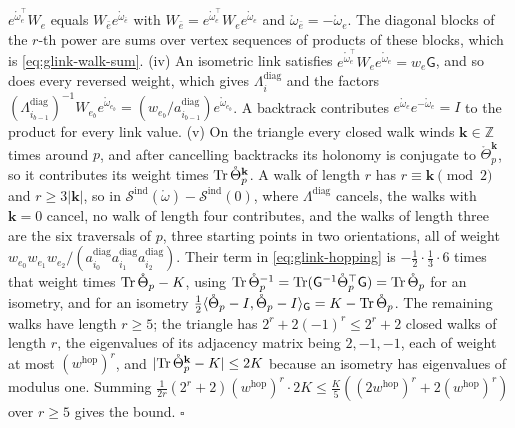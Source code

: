 \(e^{\mathring\omega_e^\top}W_e\) equals \(W_{\bar e}e^{\mathring\omega_{\bar e}}\) with
\(W_{\bar e}=e^{\mathring\omega_e^\top}W_ee^{\mathring\omega_e}\) and \(\mathring\omega_{\bar e}=-\mathring\omega_e\). The
diagonal blocks of the \(r\)-th power are sums over vertex sequences of products of these blocks, which
is \eqref{eq:glink-walk-sum}.
(iv) An isometric link satisfies \(e^{\mathring\omega_e^\top}W_ee^{\mathring\omega_e}=w_e\mathsf G\), and so does
every reversed weight, which gives \(\Lambda^{\mathrm{diag}}_i\) and the factors
\((\Lambda^{\mathrm{diag}}_{i_{b-1}})^{-1}W_{e_b}e^{\mathring\omega_{e_b}}=(w_{e_b}/a^{\mathrm{diag}}_{i_{b-1}})e^{\mathring\omega_{e_b}}\).
A backtrack contributes \(e^{\mathring\omega_e}e^{-\mathring\omega_e}=I\) to the product for every link value.
(v) On the triangle every closed walk winds \(\mathbf k\in\mathbb Z\) times around \(p\), and after
cancelling backtracks its holonomy is conjugate to \(\mathring\Theta_p^{\mathbf k}\), so it contributes its
weight times \(\operatorname{Tr}\mathring\Theta_p^{\mathbf k}\). A walk of length \(r\) has \(r\equiv\mathbf k\pmod2\) and
\(r\geq3\lvert\mathbf k\rvert\), so in \(\mathscr S^{\mathrm{ind}}(\mathring\omega)-\mathscr S^{\mathrm{ind}}(0)\),
where \(\Lambda^{\mathrm{diag}}\) cancels, the walks with \(\mathbf k=0\) cancel, no walk of length four
contributes, and the walks of length three are the six traversals of \(p\), three starting points in two
orientations, all of weight \(w_{e_0}w_{e_1}w_{e_2}/(a^{\mathrm{diag}}_{i_0}a^{\mathrm{diag}}_{i_1}a^{\mathrm{diag}}_{i_2})\). Their term in
\eqref{eq:glink-hopping} is \(-\tfrac12\cdot\tfrac13\cdot6\) times that weight times
\(\operatorname{Tr}\mathring\Theta_p-K\), using
\(\operatorname{Tr}\mathring\Theta_p^{-1}=\operatorname{Tr}(\mathsf G^{-1}\mathring\Theta_p^\top\mathsf G)=\operatorname{Tr}\mathring\Theta_p\) for an
isometry, and for an isometry
\(\tfrac12\langle\mathring\Theta_p-I,\mathring\Theta_p-I\rangle_{\mathsf G}=K-\operatorname{Tr}\mathring\Theta_p\). The
remaining walks have length \(r\geq5\); the triangle has \(2^r+2(-1)^r\leq2^r+2\) closed walks of length
\(r\), the eigenvalues of its adjacency matrix being \(2,-1,-1\), each of weight at most
\((w^{\mathrm{hop}})^r\), and
\(\lvert\operatorname{Tr}\mathring\Theta_p^{\mathbf k}-K\rvert\leq2K\) because an isometry has eigenvalues of modulus one.
Summing \(\tfrac1{2r}(2^r+2)(w^{\mathrm{hop}})^r\cdot2K\leq\tfrac K5((2w^{\mathrm{hop}})^r+2(w^{\mathrm{hop}})^r)\)
over \(r\geq5\) gives the bound. \hfill$\square$

